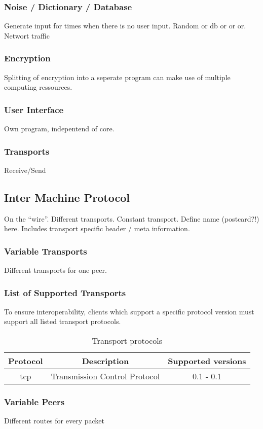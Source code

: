 \subsubsection{Noise / Dictionary / Database}
Generate input for times when there is no user input.
Random or db or or or.
Networt traffic
\subsubsection{Encryption}
Splitting of encryption into a seperate program can make use of
multiple computing ressources.
\subsubsection{User Interface}
Own program, indepentend of core.
\subsubsection{Transports}
Receive/Send

\subsection{Inter Machine Protocol}
On the "`wire"'. Different transports. Constant transport.
Define name (postcard?!) here. Includes transport specific
header / meta information.

\subsubsection{Variable Transports}
Different transports for one peer.
\subsubsection{List of Supported Transports}
To ensure interoperability, clients which support a specific
protocol version must support all listed transport protocols.
\begin{longtable}{|c|c|c|}
\caption{Transport protocols}\\
\hline
\textbf{Protocol} & \textbf{Description} & \textbf{Supported versions}\\
\hline
tcp & Transmission Control Protocol & 0.1 - 0.1\\
\hline
\end{longtable}

\subsubsection{Variable Peers}
Different routes for every packet
